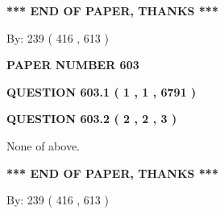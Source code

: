 \documentclass[12pt]{article}
\begin{document}
 
 
 
   
   
 \vspace{0.2in}
 
   
   
   
   
\vspace{1.0in} 
{\textbf{\large{ *** END OF PAPER, THANKS *** }}} 
   
   
\hspace{1.0in} By: 
 239 ( 416 ,  613 )
   
   
   
   
\newpage 
\setcounter{page}{ 
   603001 } 
   
   
   
   
 {\textbf{ \Large{ PAPER NUMBER  603  }}}
   
   
\vspace{0.2in}
   
   
   
   
   
   
 \vspace{0.2in}
 
 
 
 
   
   
  
\vspace{0.2in}
  
{\textbf{\Large{QUESTION
603.1 
 ( 1 , 1 , 6791 )
}}}
  
  
  
\vspace{0.2in}
  
{\textbf{\Large{QUESTION
603.2 
 ( 2 , 2 , 3 )
}}}
  
  
 
 
\noindent{}
 
 
 None of above.
 
 
 
 
   
   
 \vspace{0.2in}
 
   
   
   
   
\vspace{1.0in} 
{\textbf{\large{ *** END OF PAPER, THANKS *** }}} 
   
   
\hspace{1.0in} By: 
 239 ( 416 ,  613 )
   
\end{document}

